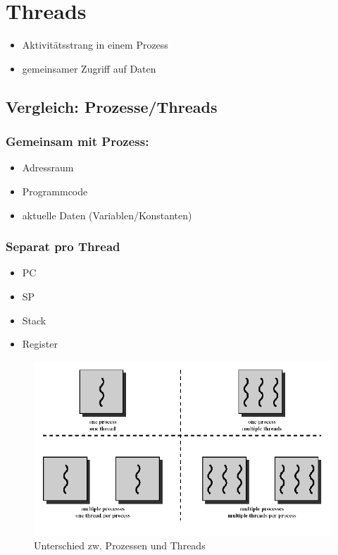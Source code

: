 \section{Threads}
\begin{itemize}
    \item Aktivitätsstrang in einem Prozess
    \item gemeinsamer Zugriff auf Daten
\end{itemize}

\subsection{Vergleich: Prozesse/Threads}

\subsubsection{Gemeinsam mit Prozess:}
\begin{itemize}
    \item Adressraum
    \item Programmcode
    \item aktuelle Daten (Variablen/Konstanten)
\end{itemize}

\subsubsection{Separat pro Thread}
\begin{itemize}
    \item PC
    \item SP
    \item Stack
    \item Register
\end{itemize}

\begin{figure}[ht!]
    \includegraphics[width=\linewidth]{pics/processes_vs_threads}
    \caption{Unterschied zw. Prozessen und Threads}
\end{figure}

